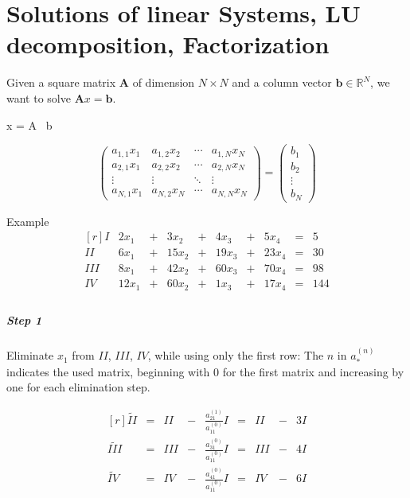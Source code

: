 \chapter{Solutions of linear Systems, LU decomposition, Factorization} %
\label{cha:solutions_of_linear_systems_lu_decomposition_factorisation}

Given a square matrix $\mathbf{A}$ of dimension $N \times N$ and a column vector 
$\mathbf{b} \in \mathbb{R}^N$, we want to solve $\mathbf{A}x = \mathbf{b}$.

\begin{Matlab}
	x = A \ b
\end{Matlab}

\[ 
	\begin{pmatrix}
		a_{1,1}x_1 & a_{1,2}x_2 & \cdots & a_{1,N}x_N \\
		a_{2,1}x_1 & a_{2,2}x_2 & \cdots & a_{2,N}x_N \\
		\vdots  & \vdots  & \ddots & \vdots  \\
		a_{N,1}x_1 & a_{N,2}x_N & \cdots & a_{N,N}x_N
	\end{pmatrix}
	=
	\begin{pmatrix}
		b_1 \\
		b_2 \\
		\vdots \\
		b_N
	\end{pmatrix}
 \]

Example
\[\begin{matrix*}[r]
		I   &  2x_1 & + &   3x_2 & + &   4x_3 & + &  5x_4 & = &   5 \\
		II  &  6x_1 & + &  15x_2 & + &  19x_3 & + & 23x_4 & = &  30 \\
		III &  8x_1 & + &  42x_2 & + &  60x_3 & + & 70x_4 & = &  98 \\
		IV  & 12x_1 & + &  60x_2 & + &   1x_3 & + & 17x_4 & = & 144 \\
\end{matrix*}\]


\paragraph{Step 1}

Eliminate $x_1$ from $II$, $III$, $IV$, while using only the first row:
The $n$ in $a_{*}^{(n)}$ indicates the used matrix, beginning with $0$ for the 
first matrix and increasing by one for each elimination step.

\[\begin{matrix*}[r]
	\tilde{II}  & = & II  & - & \frac{a_{21}^{(1)}}{a_{11}^{(0)}} I & = & II  & - & 3I \\
	\tilde{III} & = & III & - & \frac{a_{31}^{(0)}}{a_{11}^{(0)}} I & = & III & - & 4I \\
	\tilde{IV}  & = & IV  & - & \frac{a_{41}^{(0)}}{a_{11}^{(0)}} I & = & IV  & - & 6I \\
\end{matrix*}\]

